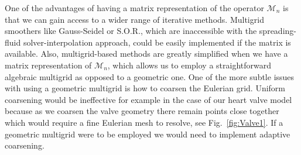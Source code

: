 \documentclass[preprint,12pt]{elsarticle}
\begin{document}
One of the advantages of having a matrix representation of the operator $\mathcal{M}_n$ is that we can gain access to  a wider range of iterative methods.  Multigrid smoothers like Gauss-Seidel or S.O.R., which are inaccessible with the spreading-fluid solver-interpolation approach, could be easily implemented if the matrix  is available.
Also, multigrid-based methods are greatly simplified when we have a matrix representation of $\mathcal{M}_n$, which allows us to employ a straightforward algebraic multigrid as opposed to a geometric one. One of the more subtle issues with using a geometric multigrid is how to coarsen the Eulerian grid. Uniform coarsening would be ineffective for example in the case of our heart valve model 
 because as we coarsen the valve geometry there remain points close together which would require a fine Eulerian mesh to resolve, see Fig.~\ref{fig:Valve1}. If a geometric multigrid were to be employed we would need to implement adaptive coarsening.
 
\end{document}
